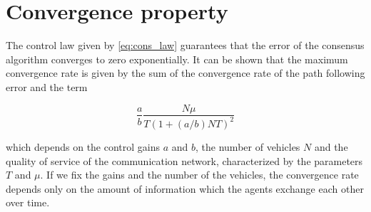 \section{Convergence property\label{sec:convergence_property}}

The control law given by \eqref{eq:cons_law} guarantees that the error of the
consensus algorithm converges to zero exponentially.
It can be shown that the maximum convergence rate is given by the sum of
the convergence rate of the path following error and the term

\begin{equation}
  \frac{a}{b} \frac{N \mu}{T ( 1 + (a / b) N T)^2}
\end{equation}

which depends on the control gains $a$ and $b$, the number of vehicles $N$ and
the quality of service of the communication network, characterized by the parameters
$T$ and $\mu$.
If we fix the gains and the number of the vehicles, the convergence rate depends
only on the amount of information which the agents exchange each other over time.
